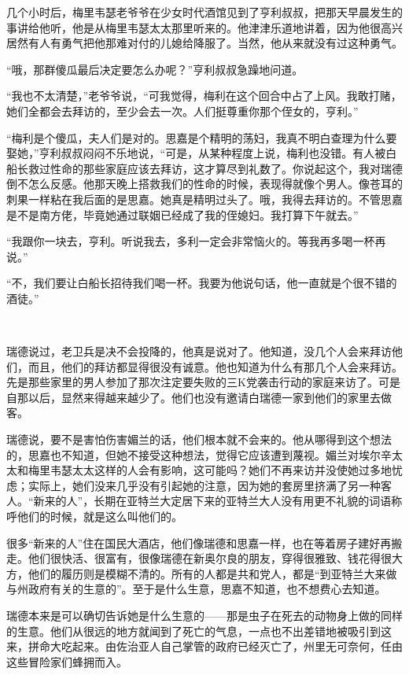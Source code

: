 \par 几个小时后，梅里韦瑟老爷爷在少女时代酒馆见到了亨利叔叔，把那天早晨发生的事讲给他听，他是从梅里韦瑟太太那里听来的。他津津乐道地讲着，因为他很高兴居然有人有勇气把他那难对付的儿媳给降服了。当然，他从来就没有过这种勇气。
\par “哦，那群傻瓜最后决定要怎么办呢？”亨利叔叔急躁地问道。
\par “我也不太清楚，”老爷爷说，“可我觉得，梅利在这个回合中占了上风。我敢打赌，她们全都会去拜访的，至少会去一次。人们挺尊重你那个侄女的，亨利。”
\par “梅利是个傻瓜，夫人们是对的。思嘉是个精明的荡妇，我真不明白查理为什么要娶她，”亨利叔叔闷闷不乐地说，“可是，从某种程度上说，梅利也没错。有人被白船长救过性命的那些家庭应该去拜访，这才算尽到礼数了。你说起这个，我对瑞德倒不怎么反感。他那天晚上搭救我们的性命的时候，表现得就像个男人。像苍耳的刺果一样粘在我后面的是思嘉。她真是精明过头了。哦，我得去拜访的。不管思嘉是不是南方佬，毕竟她通过联姻已经成了我的侄媳妇。我打算下午就去。”
\par “我跟你一块去，亨利。听说我去，多利一定会非常恼火的。等我再多喝一杯再说。”
\par “不，我们要让白船长招待我们喝一杯。我要为他说句话，他一直就是个很不错的酒徒。”
\par  
\par 瑞德说过，老卫兵是决不会投降的，他真是说对了。他知道，没几个人会来拜访他们，而且，他们的拜访都显得很没有诚意。他也知道为什么有那几个人会来拜访。先是那些家里的男人参加了那次注定要失败的三K党袭击行动的家庭来访了。可是自那以后，显然来得越来越少了。他们也没有邀请白瑞德一家到他们的家里去做客。
\par 瑞德说，要不是害怕伤害媚兰的话，他们根本就不会来的。他从哪得到这个想法的，思嘉也不知道，但她不接受这种想法，觉得它应该遭到蔑视。媚兰对埃尔辛太太和梅里韦瑟太太这样的人会有影响，这可能吗？她们不再来访并没使她过多地忧虑；实际上，她们没来几乎没有引起她的注意，因为她的套房里挤满了另一种客人。“新来的人”，长期在亚特兰大定居下来的亚特兰大人没有用更不礼貌的词语称呼他们的时候，就是这么叫他们的。
\par 很多“新来的人”住在国民大酒店，他们像瑞德和思嘉一样，也在等着房子建好再搬走。他们很快活、很富有，很像瑞德在新奥尔良的朋友，穿得很雅致、钱花得很大方，他们的履历则是模糊不清的。所有的人都是共和党人，都是“到亚特兰大来做与州政府有关的生意的”。至于是什么生意，思嘉不知道，也不想费心去知道。
\par 瑞德本来是可以确切告诉她是什么生意的——那是虫子在死去的动物身上做的同样的生意。他们从很远的地方就闻到了死亡的气息，一点也不出差错地被吸引到这来，拼命大吃起来。由佐治亚人自己掌管的政府已经灭亡了，州里无可奈何，任由这些冒险家们蜂拥而入。
